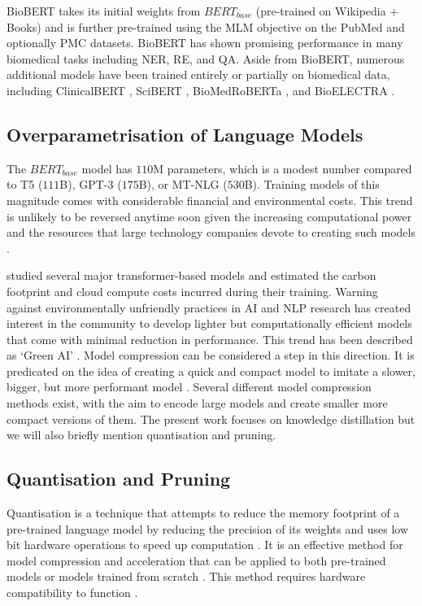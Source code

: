 \documentclass{article}
\begin{document}
BioBERT takes its initial weights from $BERT_{base}$ (pre-trained on Wikipedia + Books) and is further pre-trained using the MLM objective on the PubMed and optionally PMC datasets. BioBERT has shown promising performance in many biomedical tasks including NER, RE, and QA. Aside from BioBERT, numerous additional models have been trained entirely or partially on biomedical data, including ClinicalBERT \citep{huang2019clinicalbert}, SciBERT \citep{beltagy-etal-2019-scibert}, BioMedRoBERTa \citep{gururangan-etal-2020-dont}, and BioELECTRA \citep{raj2021bioelectra}. 

\subsection{Overparametrisation of Language Models}

The $BERT_{base}$ model has $110$M parameters, which is a modest number compared to T5 ($111$B), GPT-3 ($175$B), or MT-NLG ($530$B). Training models of this magnitude comes with considerable financial and environmental costs. This trend is unlikely to be reversed anytime soon given the increasing computational power and the resources that large technology companies devote to creating such models \citep{bender2021dangers}. 

\citet{strubell2019energy} studied several major transformer-based models and estimated the carbon footprint and cloud compute costs incurred during their training.  Warning against environmentally unfriendly practices in AI and NLP research has created interest in the community to develop lighter but computationally efficient models that come with minimal reduction in performance. This trend has been described as `Green AI' \citep{schwartz2020green}. Model compression can be considered a step in this direction. It is predicated on the idea of creating a quick and compact model to imitate a slower, bigger, but more performant model \citep{bucilua2006model}. Several different model compression methods exist, with the aim to encode large models and create smaller more compact versions of them. The present work focuses on knowledge distillation but we will also briefly mention quantisation and pruning. 

\subsection{Quantisation and Pruning}

Quantisation is a technique that attempts to reduce the memory footprint of a pre-trained language model by reducing the precision of its weights and uses low bit hardware operations to speed up computation \citep{shen2020q}. It is an effective method for model compression and acceleration that can be applied to both pre-trained models or models trained from scratch \citep{cheng2017survey}. This method requires hardware compatibility to function \citep{rogers2020primer}. 
\end{document}
